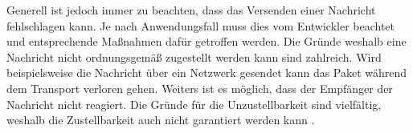 Generell ist jedoch immer zu beachten, dass das Versenden einer Nachricht fehlschlagen kann. Je nach Anwendungsfall muss dies vom Entwickler beachtet und entsprechende Maßnahmen dafür getroffen werden. Die Gründe weshalb eine Nachricht nicht ordnungsgemäß zugestellt werden kann sind zahlreich. Wird beispielsweise die Nachricht über ein Netzwerk gesendet kann das Paket während dem Transport verloren gehen. Weiters ist es möglich, dass der Empfänger der Nachricht nicht reagiert. Die Gründe für die Unzustellbarkeit sind vielfältig, weshalb die Zustellbarkeit auch nicht garantiert werden kann \citep{kuhn2017reactive}.







 